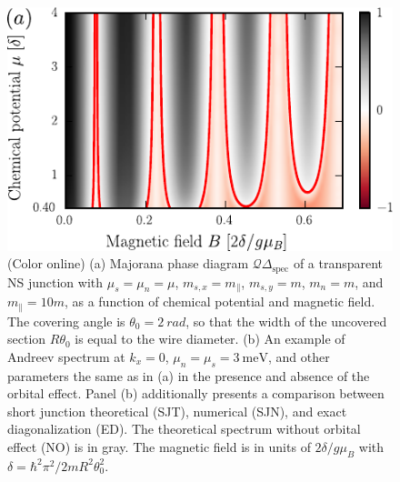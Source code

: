 \begin{figure}[t]
\includegraphics[width=\columnwidth]{chapter_shortjunction/figures/gaps_orb}
\caption{(Color online) (a) Majorana phase diagram $\mathcal{Q} \Delta_\textrm{spec}$ of a transparent NS junction with $\mu_s=\mu_n=\mu$, $m_{s,x}=m_\parallel$, $m_{s,y}=m$, $m_n=m$, and $m_\parallel=10 m$, as a function of chemical potential and magnetic field.
The covering angle is $\theta_0 = \SI{2}{rad}$, so that the width of the uncovered section $R\theta_0$ is equal to the wire diameter.
(b) An example of Andreev spectrum at $k_x=0$, $\mu_n=\mu_s=\SI{3}{\meV}$, and other parameters the same as in (a) in the presence and absence of the orbital effect.
Panel (b) additionally presents a comparison between short junction theoretical (SJT), numerical (SJN), and exact diagonalization (ED).
The theoretical spectrum without orbital effect (NO) is in gray.
The magnetic field is in units of $2\delta/g\mu_B$ with $\delta=\hbar^2\pi^2/2mR^2\theta_0^2$.}
\label{fig:gaps_orb}
\end{figure}

